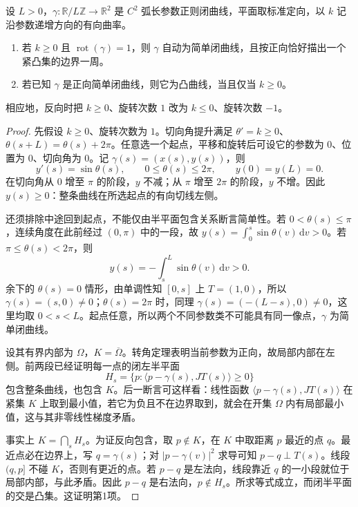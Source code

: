 \begin{theorem}\label{g1:thm:curvature-convexity}
	设 \(L>0\)，\(\gamma:\mathbb R/L\mathbb Z\rightarrow\mathbb R^2\) 是 \(C^2\) 弧长参数正则闭曲线，平面取标准定向，以 \(k\) 记沿参数递增方向的有向曲率。
	\begin{enumerate}
		\item 若 \(k\geq0\) 且 \(\operatorname{rot}(\gamma)=1\)，则 \(\gamma\) 自动为简单闭曲线，且按正向恰好描出一个紧凸集的边界一周。
		\item 若已知 \(\gamma\) 是正向简单闭曲线，则它为凸曲线，当且仅当 \(k\geq0\)。
	\end{enumerate}
	相应地，反向时把 \(k\geq0\)、旋转次数 \(1\) 改为 \(k\leq0\)、旋转次数 \(-1\)。
\end{theorem}
\begin{proof}
	先假设 \(k\geq0\)、旋转次数为 \(1\)。切向角提升满足 \(\theta'=k\geq0\)、\(\theta(s+L)=\theta(s)+2\pi\)。任意选一个起点，平移和旋转后可设它的参数为 \(0\)、位置为 \(0\)、切向角为 \(0\)。记 \(\gamma(s)=(x(s),y(s))\)，则
	\[
		y'(s)=\sin\theta(s),\qquad 0\leq\theta(s)\leq2\pi,\qquad y(0)=y(L)=0.
	\]
	在切向角从 \(0\) 增至 \(\pi\) 的阶段，\(y\) 不减；从 \(\pi\) 增至 \(2\pi\) 的阶段，\(y\) 不增。因此 \(y(s)\geq0\)：整条曲线在所选起点的有向切线左侧。

	还须排除中途回到起点，不能仅由半平面包含关系断言简单性。若 \(0<\theta(s)\leq\pi\)，连续角度在此前经过 \((0,\pi)\) 中的一段，故 \(y(s)=\int_0^s\sin\theta(v)\,\mathrm{d}v>0\)。若 \(\pi\leq\theta(s)<2\pi\)，则
	\[
		y(s)=-\int_s^L\sin\theta(v)\,\mathrm{d}v>0.
	\]
	余下的 \(\theta(s)=0\) 情形，由单调性知 \([0,s]\) 上 \(T=(1,0)\)，所以 \(\gamma(s)=(s,0)\ne0\)；\(\theta(s)=2\pi\) 时，同理 \(\gamma(s)=(-(L-s),0)\ne0\)，这里均取 \(0<s<L\)。起点任意，所以两个不同参数类不可能具有同一像点，\(\gamma\) 为简单闭曲线。

	设其有界内部为 \(\Omega\)，\(K=\overline\Omega\)。转角定理表明当前参数为正向，故局部内部在左侧。前两段已经证明每一点的闭左半平面
	\[
		H_s=\{p:\langle p-\gamma(s),JT(s)\rangle\geq0\}
	\]
	包含整条曲线，也包含 \(K\)。后一断言可这样看：线性函数 \(\langle p-\gamma(s),JT(s)\rangle\) 在紧集 \(K\) 上取到最小值，若它为负且不在边界取到，就会在开集 \(\Omega\) 内有局部最小值，这与其非零线性梯度矛盾。

	事实上 \(K=\bigcap_sH_s\)。为证反向包含，取 \(p\notin K\)，在 \(K\) 中取距离 \(p\) 最近的点 \(q\)。最近点必在边界上，写 \(q=\gamma(s)\)；对 \(|p-\gamma(v)|^2\) 求导可知 \(p-q\perp T(s)\)。线段 \((q,p]\) 不碰 \(K\)，否则有更近的点。若 \(p-q\) 是左法向，线段靠近 \(q\) 的一小段就位于局部内部，与此矛盾。因此 \(p-q\) 是右法向，\(p\notin H_s\)。所求等式成立，而闭半平面的交是凸集。这证明第1项。


\end{proof}
